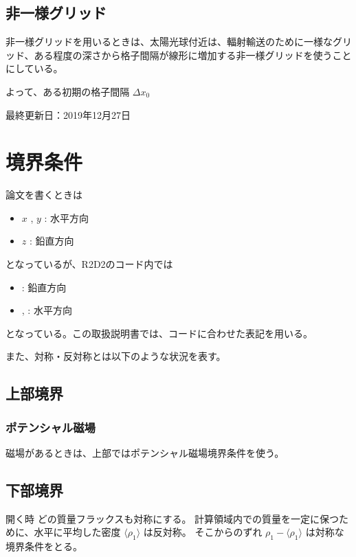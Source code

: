 \documentclass[letterpaper,10pt,dvipdfmx,report]{sphinxmanual}
\let\sphinxpxdimen\pdfpxdimen\else\newdimen\sphinxpxdimen
\begin{document}
\section{非一様グリッド}
\label{\detokenize{geometry:id3}}
非一様グリッドを用いるときは、太陽光球付近は、輻射輸送のために一様なグリッド、ある程度の深さから格子間隔が線形に増加する非一様グリッドを使うことにしている。

よって、ある初期の格子間隔 \(\Delta x_0\)

最終更新日：2019年12月27日


\chapter{境界条件}
\label{\detokenize{boundary:id1}}\label{\detokenize{boundary::doc}}
論文を書くときは
\begin{itemize}
\item {} 
\(x\) , \(y\) : 水平方向

\item {} 
\(z\) : 鉛直方向

\end{itemize}

となっているが、R2D2のコード内では
\begin{itemize}
\item {} 
: 鉛直方向

\item {} 
, : 水平方向

\end{itemize}

となっている。この取扱説明書では、コードに合わせた表記を用いる。

また、対称・反対称とは以下のような状況を表す。

\noindent\sphinxincludegraphics[width=450\sphinxpxdimen]{{bc_sym}.png}


\section{上部境界}
\label{\detokenize{boundary:id2}}

\subsection{ポテンシャル磁場}
\label{\detokenize{boundary:id3}}
磁場があるときは、上部ではポテンシャル磁場境界条件を使う。


\section{下部境界}
\label{\detokenize{boundary:id4}}
開く時
どの質量フラックスも対称にする。 計算領域内での質量を一定に保つために、水平に平均した密度
\(\langle \rho_1\rangle\) は反対称。 そこからのずれ
\(\rho_1 - \langle \rho_1 \rangle\) は対称な境界条件をとる。
\end{document}
